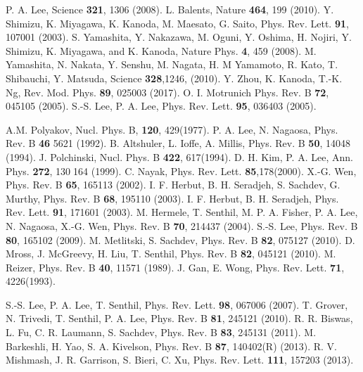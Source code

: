\documentclass[12pt]{article}
\begin{document}
\begin{thebibliography}{99}
 P. A. Lee, Science \textbf{321}, 1306 (2008).
 L. Balents, Nature \textbf{464}, 199 (2010).
 Y. Shimizu, K. Miyagawa, K. Kanoda, M. Maesato, G. Saito, Phys. Rev. Lett. \textbf{91}, 107001 (2003).
S. Yamashita, Y. Nakazawa, M. Oguni, Y. Oshima, H. Nojiri, Y. Shimizu, K. Miyagawa, and K. Kanoda, Nature Phys. \textbf{4}, 459 (2008).
M. Yamashita, N. Nakata, Y. Senshu, M. Nagata, H. M Yamamoto, R. Kato, T. Shibauchi, Y. Matsuda, Science \textbf{328},1246, (2010).
Y. Zhou, K. Kanoda, T.-K. Ng, Rev. Mod. Phys. \textbf{89}, 025003 (2017).
O. I. Motrunich  Phys. Rev. B \textbf{72}, 045105 (2005).
S.-S. Lee, P. A. Lee, Phys. Rev. Lett. \textbf{95}, 036403 (2005).

A.M. Polyakov, Nucl. Phys. B, \textbf{120}, 429(1977).
P. A. Lee, N. Nagaosa, Phys. Rev. B \textbf{46} 5621 (1992).
B. Altshuler, L. Ioffe, A. Millis, Phys. Rev. B \textbf{50}, 14048 (1994).
J. Polchinski,  Nucl. Phys. B \textbf{422}, 617(1994).
D. H. Kim, P. A. Lee, Ann. Phys. \textbf{272}, 130􏰤164 (1999).
C. Nayak, Phys. Rev. Lett. \textbf{85},178(2000).
X.-G. Wen, Phys. Rev. B \textbf{65}, 165113 (2002).
I. F. Herbut, B. H. Seradjeh, S. Sachdev, G. Murthy, Phys. Rev. B \textbf{68}, 195110 (2003).
I. F. Herbut, B. H. Seradjeh, Phys. Rev. Lett. \textbf{91}, 171601 (2003).
 M. Hermele, T. Senthil, M. P. A. Fisher, P. A. Lee, N. Nagaosa, X.-G. Wen, Phys. Rev. B \textbf{70}, 214437 (2004).
S.-S. Lee, Phys. Rev. B \textbf{80}, 165102 (2009).
M. Metlitski, S. Sachdev, Phys. Rev. B \textbf{82}, 075127 (2010).
D. Mross, J. McGreevy, H. Liu, T. Senthil, Phys. Rev. B \textbf{82}, 045121 (2010).
M. Reizer, Phys. Rev. B \textbf{40}, 11571 (1989).
J. Gan, E. Wong, Phys. Rev. Lett. \textbf{71}, 4226(1993).

S.-S. Lee, P. A. Lee, T. Senthil, Phys. Rev. Lett. \textbf{98}, 067006 (2007).
T. Grover, N. Trivedi, T. Senthil, P. A. Lee, Phys. Rev. B \textbf{81}, 245121 (2010).
R. R. Biswas, L. Fu, C. R. Laumann, S. Sachdev, Phys. Rev. B \textbf{83}, 245131 (2011).
M. Barkeshli, H. Yao, S. A. Kivelson, Phys. Rev. B \textbf{87}, 140402(R) (2013).
R. V. Mishmash, J. R. Garrison, S. Bieri, C. Xu, Phys. Rev. Lett. \textbf{111}, 157203 (2013).



\end{thebibliography}
\end{document}

